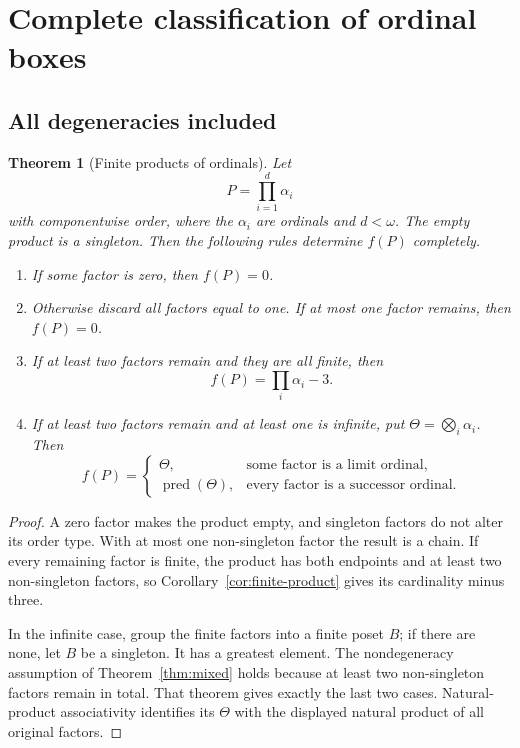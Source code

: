 \documentclass[11pt,letterpaper]{article}
\newtheorem{theorem}{Theorem}[section]
\theoremstyle{definition}
\theoremstyle{remark}
\newcommand{\pred}{\operatorname{pred}}
\begin{document}
\section{Complete classification of ordinal boxes}\label{sec:boxes}

\subsection{All degeneracies included}

\begin{theorem}[Finite products of ordinals]\label{thm:boxes}
Let
\[
 P=\prod_{i=1}^d\alpha_i
\]
with componentwise order, where the $\alpha_i$ are ordinals and $d<\omega$.
The empty product is a singleton. Then the following rules determine
$f(P)$ completely.
\begin{enumerate}[label=(\arabic*)]
\item If some factor is zero, then $f(P)=0$.
\item Otherwise discard all factors equal to one. If at most one factor
remains, then $f(P)=0$.
\item If at least two factors remain and they are all finite, then
\[
 f(P)=\prod_i\alpha_i-3.
\]
\item If at least two factors remain and at least one is infinite, put
$\Theta=\bigotimes_i\alpha_i$. Then
\[
 f(P)=
 \begin{cases}
  \Theta,&\text{some factor is a limit ordinal},\\
  \pred(\Theta),&\text{every factor is a successor ordinal}.
 \end{cases}
\]
\end{enumerate}
\end{theorem}
\begin{proof}
A zero factor makes the product empty, and singleton factors do not alter
its order type. With at most one non-singleton factor the result is a
chain. If every remaining factor is finite, the product has both endpoints
and at least two non-singleton factors, so Corollary~\ref{cor:finite-product}
gives its cardinality minus three.

In the infinite case, group the finite factors into a finite poset $B$;
if there are none, let $B$ be a singleton. It has a greatest element. The
nondegeneracy assumption of Theorem~\ref{thm:mixed} holds because at least
two non-singleton factors remain in total. That theorem gives exactly the
last two cases. Natural-product associativity identifies its $\Theta$
with the displayed natural product of all original factors.
\end{proof}
\end{document}
